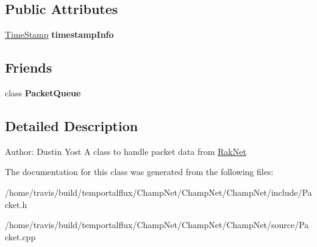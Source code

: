 \subsection*{Public Attributes}
\begin{DoxyCompactItemize}
\item 
\hypertarget{class_champ_net_1_1_packet_a0fcefd5ba56854e5a8e3e63a51e3963e}{\hyperlink{struct_champ_net_1_1_time_stamp}{Time\-Stamp} {\bfseries timestamp\-Info}}\label{class_champ_net_1_1_packet_a0fcefd5ba56854e5a8e3e63a51e3963e}

\end{DoxyCompactItemize}
\subsection*{Friends}
\begin{DoxyCompactItemize}
\item 
\hypertarget{class_champ_net_1_1_packet_ac3f1afb9cc164b535c73e6f5909519ff}{class {\bfseries Packet\-Queue}}\label{class_champ_net_1_1_packet_ac3f1afb9cc164b535c73e6f5909519ff}

\end{DoxyCompactItemize}


\subsection{Detailed Description}
Author\-: Dustin Yost A class to handle packet data from \hyperlink{namespace_rak_net}{Rak\-Net} 

The documentation for this class was generated from the following files\-:\begin{DoxyCompactItemize}
\item 
/home/travis/build/temportalflux/\-Champ\-Net/\-Champ\-Net/\-Champ\-Net/include/Packet.\-h\item 
/home/travis/build/temportalflux/\-Champ\-Net/\-Champ\-Net/\-Champ\-Net/source/Packet.\-cpp\end{DoxyCompactItemize}
